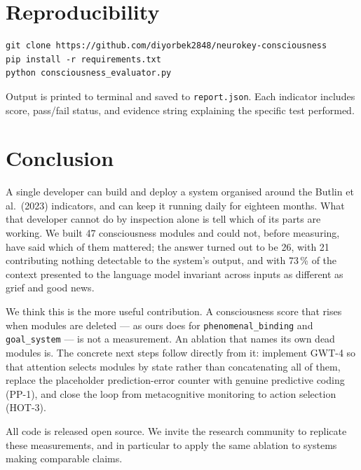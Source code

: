\documentclass[11pt,a4paper]{article}
\begin{document}
\section{Reproducibility}

\begin{verbatim}
git clone https://github.com/diyorbek2848/neurokey-consciousness
pip install -r requirements.txt
python consciousness_evaluator.py
\end{verbatim}

Output is printed to terminal and saved to \texttt{report.json}.
Each indicator includes score, pass/fail status, and evidence string explaining
the specific test performed.

\section{Conclusion}

A single developer can build and deploy a system organised around the Butlin et al.\ (2023)
indicators, and can keep it running daily for eighteen months. What that developer cannot do
by inspection alone is tell which of its parts are working. We built 47 consciousness modules
and could not, before measuring, have said which of them mattered; the answer turned out to be
26, with 21 contributing nothing detectable to the system's output, and with 73\,\% of the
context presented to the language model invariant across inputs as different as grief and good
news.

We think this is the more useful contribution. A consciousness score that rises when modules
are deleted --- as ours does for \texttt{phenomenal\_binding} and \texttt{goal\_system} --- is
not a measurement. An ablation that names its own dead modules is. The concrete next steps
follow directly from it: implement GWT-4 so that attention selects modules by state rather
than concatenating all of them, replace the placeholder prediction-error counter with genuine
predictive coding (PP-1), and close the loop from metacognitive monitoring to action selection
(HOT-3).

All code is released open source. We invite the research community to replicate these
measurements, and in particular to apply the same ablation to systems making comparable
claims.
\end{document}
